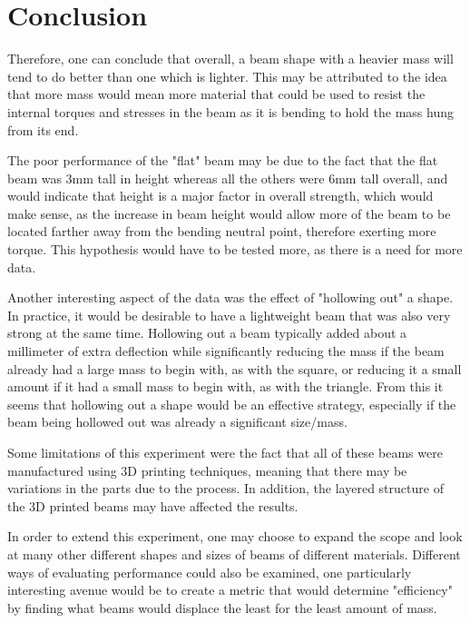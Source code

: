 \documentclass{article}
\begin{document}
\section*{Conclusion}

\quad \quad Therefore, one can conclude that overall, a beam shape with a heavier mass will tend to do better than one which is lighter. This may be attributed to the idea that more mass would mean more material that could be used to resist the internal torques and stresses in the beam as it is bending to hold the mass hung from its end. 

The poor performance of the "flat" beam may be due to the fact that the flat beam was 3mm tall in height whereas all the others were 6mm tall overall, and would indicate that height is a major factor in overall strength, which would make sense, as the increase in beam height would allow more of the beam to be located farther away from the bending neutral point, therefore exerting more torque. This hypothesis would have to be tested more, as there is a need for more data. 

Another interesting aspect of the data was the effect of "hollowing out" a shape. In practice, it would be desirable to have a lightweight beam that was also very strong at the same time. Hollowing out a beam typically added about a millimeter of extra deflection while significantly reducing the mass if the beam already had a large mass to begin with, as with the square, or reducing it a small amount if it had a small mass to begin with, as with the triangle. From this it seems that hollowing out a shape would be an effective strategy, especially if the beam being hollowed out was already a significant size/mass.

Some limitations of this experiment were the fact that all of these beams were manufactured using 3D printing techniques, meaning that there may be variations in the parts due to the process. In addition, the layered structure of the 3D printed beams may have affected the results. 

In order to extend this experiment, one may choose to expand the scope and look at many other different shapes and sizes of beams of different materials. Different ways of evaluating performance could also be examined, one particularly interesting avenue would be to create a metric that would determine "efficiency" by finding what beams would displace the least for the least amount of mass.

 
\end{document}
